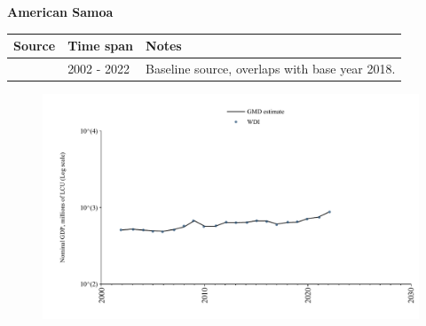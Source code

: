\documentclass[12pt,a4paper,landscape]{article}
\begin{document}
\begin{adjustbox}{max totalsize={\paperwidth}{\paperheight},center}
\begin{minipage}[t][\textheight][t]{\textwidth}
\vspace*{0.5cm}
{}
\begin{center}
{\Large\bfseries American Samoa}
\end{center}
\vspace{0.5cm}
\begin{table}[H]
\centering
\small
\begin{tabular}{|l|l|l|}
\hline
\textbf{Source} & \textbf{Time span} & \textbf{Notes} \\
\hline
\rowcolor{white}\cite{WDI}& 2002 - 2022 &Baseline source, overlaps with base year 2018.\\
\hline
\end{tabular}
\end{table}
\begin{figure}[H]
\centering
\includegraphics[width=\textwidth,height=0.6\textheight,keepaspectratio]{graphs/ASM_nGDP.pdf}
\end{figure}
\end{minipage}
\end{adjustbox}
\end{document}
